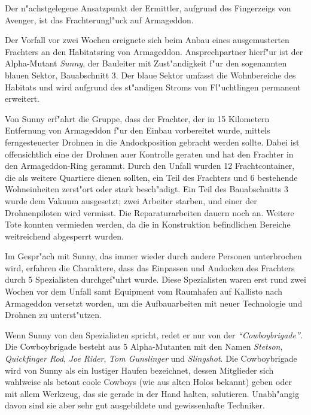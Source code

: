 
Der n"achstgelegene Ansatzpunkt der Ermittler, aufgrund des Fingerzeigs von Avenger, ist das Frachterungl"uck auf Armageddon.

Der Vorfall vor zwei Wochen ereignete sich beim Anbau eines ausgemusterten Frachters an den Habitatsring von Armageddon. Ansprechpartner hierf"ur ist der Alpha-Mutant \emph{Sunny}, der Bauleiter mit Zust"andigkeit f"ur den sogenannten blauen Sektor, Bauabschnitt 3. Der blaue Sektor umfasst die Wohnbereiche des Habitats und wird aufgrund des st"andigen Stroms von Fl"uchtlingen permanent erweitert.

Von Sunny erf"ahrt die Gruppe, dass der Frachter, der in 15 Kilometern Entfernung von Armageddon f"ur den Einbau vorbereitet wurde, mittels ferngesteuerter Drohnen in die Andockposition gebracht werden sollte. Dabei ist offensichtlich eine der Drohnen au\3er Kontrolle geraten und hat den Frachter in den Armageddon-Ring gerammt. Durch den Unfall wurden 12 Frachtcontainer, die als weitere Quartiere dienen sollten, ein Teil des Frachters und 6 bestehende Wohneinheiten zerst"ort oder stark besch"adigt. Ein Teil des Bauabschnitts 3 wurde dem Vakuum ausgesetzt; zwei Arbeiter starben, und einer der Drohnenpiloten wird vermisst. Die Reparaturarbeiten dauern noch an. Weitere Tote konnten vermieden werden, da die in Konstruktion befindlichen Bereiche weitreichend abgesperrt wurden.

Im Gespr"ach mit Sunny, das immer wieder durch andere Personen unterbrochen wird, erfahren die Charaktere, dass das Einpassen und Andocken des Frachters durch 5 Spezialisten durchgef"uhrt wurde. Diese Spezialisten waren erst rund zwei Wochen vor dem Unfall samt Equipment vom Raumhafen auf Kallisto nach Armageddon versetzt worden, um die Aufbauarbeiten mit neuer Technologie und Drohnen zu unterst"utzen.

Wenn Sunny von den Spezialisten spricht, redet er nur von der \emph{``Cowboybrigade''}. Die Cowboybrigade besteht aus 5 Alpha-Mutanten mit den Namen \emph{Stetson}, \emph{Quickfinger Rod}, \emph{Joe Rider}, \emph{Tom Gunslinger} und \emph{Slingshot}. Die Cowboybrigade wird von Sunny als ein lustiger Haufen bezeichnet, dessen Mitglieder sich wahlweise als betont coole Cowboys (wie aus alten Holos bekannt) geben oder mit allem Werkzeug, das sie gerade in der Hand halten, salutieren. Unabh"angig davon sind sie aber sehr gut ausgebildete und gewissenhafte Techniker.

